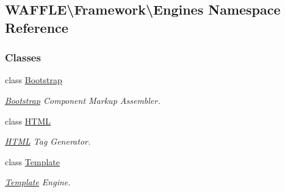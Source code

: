 \hypertarget{namespace_w_a_f_f_l_e_1_1_framework_1_1_engines}{}\subsection{W\+A\+F\+F\+LE\textbackslash{}Framework\textbackslash{}Engines Namespace Reference}
\label{namespace_w_a_f_f_l_e_1_1_framework_1_1_engines}
\subsubsection*{Classes}
\begin{DoxyCompactItemize}
\item 
class \hyperlink{class_w_a_f_f_l_e_1_1_framework_1_1_engines_1_1_bootstrap}{Bootstrap}
\begin{DoxyCompactList}\small\item\em \hyperlink{class_w_a_f_f_l_e_1_1_framework_1_1_engines_1_1_bootstrap}{Bootstrap} Component Markup Assembler. \end{DoxyCompactList}\item 
class \hyperlink{class_w_a_f_f_l_e_1_1_framework_1_1_engines_1_1_h_t_m_l}{H\+T\+ML}
\begin{DoxyCompactList}\small\item\em \hyperlink{class_w_a_f_f_l_e_1_1_framework_1_1_engines_1_1_h_t_m_l}{H\+T\+ML} Tag Generator. \end{DoxyCompactList}\item 
class \hyperlink{class_w_a_f_f_l_e_1_1_framework_1_1_engines_1_1_template}{Template}
\begin{DoxyCompactList}\small\item\em \hyperlink{class_w_a_f_f_l_e_1_1_framework_1_1_engines_1_1_template}{Template} Engine. \end{DoxyCompactList}\end{DoxyCompactItemize}
